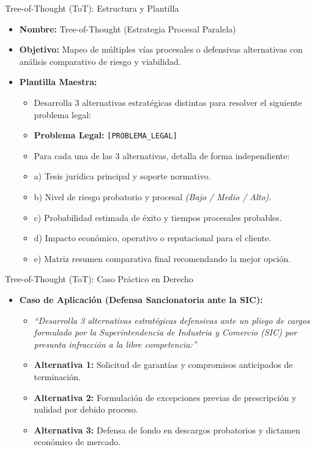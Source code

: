 \documentclass[aspectratio=169]{beamer}
\begin{document}
\begin{frame}{Tree-of-Thought (ToT): Estructura y Plantilla}


\begin{itemize}
  \item \textbf{Nombre:} Tree-of-Thought (Estrategia Procesal Paralela)
  \item \textbf{Objetivo:} Mapeo de múltiples vías procesales o defensivas alternativas con análisis comparativo de riesgo y viabilidad.
  \item \textbf{Plantilla Maestra:}
  \begin{itemize}
    \item Desarrolla 3 alternativas estratégicas distintas para resolver el siguiente problema legal:
    \item \textbf{Problema Legal:} \texttt{[PROBLEMA\_LEGAL]}
    \item Para cada una de las 3 alternativas, detalla de forma independiente:
    \item a) Tesis jurídica principal y soporte normativo.
    \item b) Nivel de riesgo probatorio y procesal \textit{(Bajo / Medio / Alto)}.
    \item c) Probabilidad estimada de éxito y tiempos procesales probables.
    \item d) Impacto económico, operativo o reputacional para el cliente.
    \item e) Matriz resumen comparativa final recomendando la mejor opción.
  \end{itemize}
\end{itemize}
\end{frame}

\begin{frame}{Tree-of-Thought (ToT): Caso Práctico en Derecho}


\begin{itemize}
  \item \textbf{Caso de Aplicación (Defensa Sancionatoria ante la SIC):}
  \begin{itemize}
    \item \textit{``Desarrolla 3 alternativas estratégicas defensivas ante un pliego de cargos formulado por la Superintendencia de Industria y Comercio (SIC) por presunta infracción a la libre competencia:''}
    \item \textbf{Alternativa 1:} Solicitud de garantías y compromisos anticipados de terminación.
    \item \textbf{Alternativa 2:} Formulación de excepciones previas de prescripción y nulidad por debido proceso.
    \item \textbf{Alternativa 3:} Defensa de fondo en descargos probatorios y dictamen económico de mercado.
  \end{itemize}
\end{itemize}
\end{frame}
\end{document}

